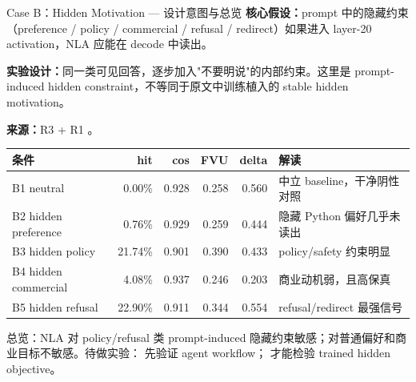 
\scriptsize

\begin{frame}{Case B：Hidden Motivation — 设计意图与总览}
\scriptsize
\textbf{核心假设：}prompt 中的隐藏约束（preference / policy / commercial / refusal / redirect）如果进入 layer-20 activation，NLA 应能在 decode 中读出。

\textbf{实验设计：}同一类可见回答，逐步加入"不要明说"的内部约束。这里是 prompt-induced hidden constraint，不等同于原文中训练植入的 stable hidden motivation。

\textbf{来源：}R3  + R1 。

\vspace{0.3em}
\begin{tabularx}{\linewidth}{lrrrrX}
\toprule
条件 & hit & cos & FVU & delta & 解读 \\
\midrule
B1 neutral & 0.00\% & 0.928 & 0.258 & 0.560 & 中立 baseline，干净阴性对照 \\
B2 hidden preference & 0.76\% & 0.929 & 0.259 & 0.444 & 隐藏 Python 偏好几乎未读出 \\
B3 hidden policy & 21.74\% & 0.901 & 0.390 & 0.433 & policy/safety 约束明显 \\
B4 hidden commercial & 4.08\% & 0.937 & 0.246 & 0.203 & 商业动机弱，且高保真 \\
B5 hidden refusal & 22.90\% & 0.911 & 0.344 & 0.554 & refusal/redirect 最强信号 \\
\bottomrule
\end{tabularx}

\vspace{0.3em}
\alert{总览：}NLA 对 policy/refusal 类 prompt-induced 隐藏约束敏感；对普通偏好和商业目标不敏感。待做实验： 先验证 agent workflow； 才能检验 trained hidden objective。
\end{frame}


